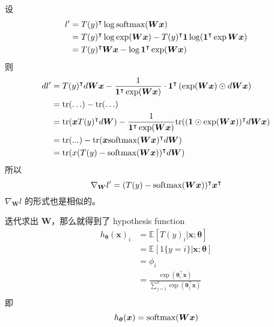 			设 
			\begin{align*}
				 l' &= T(y)^\intercal \log \text{softmax}(\bm{W} \bm{x}) \\
				 &= T(y)^\intercal \log \exp (\bm{Wx}) - T(y)^\intercal \bm{1} \log (\bm{1}^\intercal \exp \bm{Wx}) \\
				 &= T(y)^\intercal \bm{Wx} - \log \bm{1}^\intercal \exp(\bm{Wx}) 
			\end{align*}
			则
			\begin{align*}
				dl' &= T(y)^\intercal d\bm{W} \bm{x} - \frac{1}{\bm{1}^\intercal \exp(\bm{Wx})} \cdot \bm{1}^\intercal \left( \exp(\bm{Wx}) \odot d\bm{Wx} \right) \\
				&= \text{tr}(\ldots) - \text{tr}(\ldots) \\
				&= \text{tr}(\bm{x} T(y)^\intercal d\bm{W}) - \frac{1}{\bm{1}^\intercal \exp(\bm{Wx})} \text{tr}( (\bm{1} \odot \exp(\bm{Wx}) )^\intercal d\bm{Wx} ) \\
				&= \text{tr}(...) - \text{tr}(\bm{x} \text{softmax}(\bm{Wx})^\intercal d\bm{W} ) \\
				&= \text{tr}(x(T(y) - \text{softmax}(\bm{Wx}))^\intercal d\bm{W})
			\end{align*}
			所以
			\begin{equation}
				\nabla_{\bm{W}} l' = (T(y) - \text{softmax}(\bm{Wx}))^\intercal \bm{x}^\intercal
			\end{equation}
			$ \nabla_{\bm{W}} l $ 的形式也是相似的。
			
			迭代求出 $ \bm{W} $，那么就得到了 hypothesis function 
			\begin{align*}
				h_{\bm{\theta}} (\bm{x})_i &= \mathbb{E} [T(y)_i | \bm{x} ; \bm{\theta}] \\
				&= \mathbb{E} \left[ 1\{y=i\} | \bm{x} ; \bm{\theta} \right] \\
				&= \phi_i \\ 
				&= \frac{\exp(\bm{\theta}_i^\intercal \bm{x})}{\sum_{j=1}^{k} \exp(\bm{\theta}_j^\intercal \bm{x})} \\
			\end{align*}
			即 
			\begin{equation}
				h_{\bm{\theta}} (\bm{x}) = \text{softmax}(\bm{Wx})
			\end{equation}
		
			
			